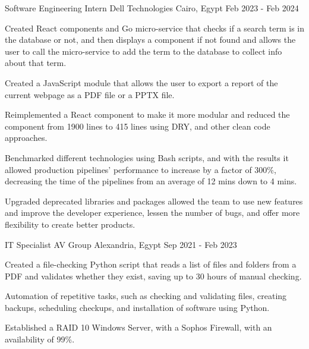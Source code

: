 

\begin{cventries}

  \cventry
   {Software Engineering Intern} %
    {Dell Technologies} %
    {Cairo, Egypt} %
    {Feb 2023 - Feb 2024} %
    {
      \begin{cvitems} %
        \item {Created React components and Go micro-service that checks if a search term is in the database or not, and then displays a component if not found and allows the user to call the micro-service to add the term to the database to collect info about that term.}
        \item {Created a JavaScript module that allows the user to export a report of the current webpage as a PDF file or a PPTX file.}
        \item {Reimplemented a React component to make it more modular and reduced the component from 1900 lines to 415 lines using DRY, and other clean code approaches.}
        \item{Benchmarked different technologies using Bash scripts, and with the results it allowed production pipelines’ performance to increase by a factor of 300\%, decreasing the time of the pipelines from an average of 12 mins down to 4 mins.}
        \item{Upgraded deprecated libraries and packages allowed the team to use new features and improve the developer experience, lessen the number of bugs, and offer more flexibility to create better products.}
      \end{cvitems}
    }
    
     \cventry
    {IT Specialist} %
    {AV Group} %
    {Alexandria, Egypt} %
    {Sep 2021 - Feb 2023} %
    {
      \begin{cvitems} %
        \item {Created a file-checking Python script that reads a list of files and folders from a PDF and validates whether they exist, saving up to 30 hours of manual checking.}
        \item {Automation of repetitive tasks, such as checking and validating files, creating backups, scheduling checkups, and installation of software using Python.}
        \item {Established a RAID 10 Windows Server, with a Sophos Firewall, with an availability of 99\%.}
      \end{cvitems}
    }
    

\end{cventries}
